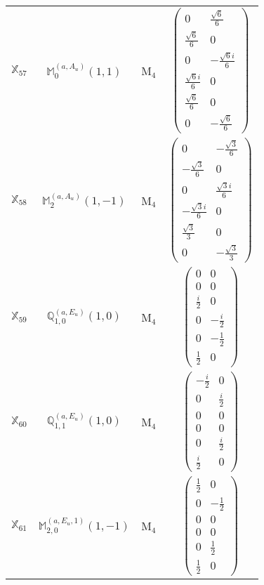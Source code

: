 \documentclass[fleqn,10pt,landscape]{article}
\begin{document}
\begin{itemize}
\begin{center}
\begin{longtable}{c|c|c|c}
$ \mathbb{X}_{57} $ & $\mathbb{M}_{0}^{(a,A_{u})}(1,1)$ & M$_{4}$ & $\begin{pmatrix} 0 & \frac{\sqrt{6}}{6} \\ \frac{\sqrt{6}}{6} & 0 \\ 0 & - \frac{\sqrt{6} i}{6} \\ \frac{\sqrt{6} i}{6} & 0 \\ \frac{\sqrt{6}}{6} & 0 \\ 0 & - \frac{\sqrt{6}}{6} \end{pmatrix}$ \\
$ \mathbb{X}_{58} $ & $\mathbb{M}_{2}^{(a,A_{u})}(1,-1)$ & M$_{4}$ & $\begin{pmatrix} 0 & - \frac{\sqrt{3}}{6} \\ - \frac{\sqrt{3}}{6} & 0 \\ 0 & \frac{\sqrt{3} i}{6} \\ - \frac{\sqrt{3} i}{6} & 0 \\ \frac{\sqrt{3}}{3} & 0 \\ 0 & - \frac{\sqrt{3}}{3} \end{pmatrix}$ \\
$ \mathbb{X}_{59} $ & $\mathbb{Q}_{1,0}^{(a,E_{u})}(1,0)$ & M$_{4}$ & $\begin{pmatrix} 0 & 0 \\ 0 & 0 \\ \frac{i}{2} & 0 \\ 0 & - \frac{i}{2} \\ 0 & - \frac{1}{2} \\ \frac{1}{2} & 0 \end{pmatrix}$ \\
$ \mathbb{X}_{60} $ & $\mathbb{Q}_{1,1}^{(a,E_{u})}(1,0)$ & M$_{4}$ & $\begin{pmatrix} - \frac{i}{2} & 0 \\ 0 & \frac{i}{2} \\ 0 & 0 \\ 0 & 0 \\ 0 & \frac{i}{2} \\ \frac{i}{2} & 0 \end{pmatrix}$ \\
$ \mathbb{X}_{61} $ & $\mathbb{M}_{2,0}^{(a,E_{u},1)}(1,-1)$ & M$_{4}$ & $\begin{pmatrix} \frac{1}{2} & 0 \\ 0 & - \frac{1}{2} \\ 0 & 0 \\ 0 & 0 \\ 0 & \frac{1}{2} \\ \frac{1}{2} & 0 \end{pmatrix}$ \\

\end{longtable}
\end{center}
\end{itemize}
\end{document}
